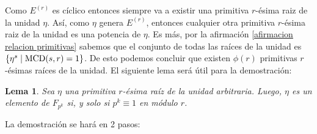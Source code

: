 \documentclass[10pt]{article}
\newcommand{\0}{\mathbf{0}}
\newcommand{\1}{\mathbf{1}}
\newcommand{\MCD}{{\rm MCD}}
\newcommand{\+}{\oplus}
\newcommand{\comentario}[1]{}
\newcommand{\comentarioin}[1]{}
\newtheorem{lemma}[theorem]{Lema}
\theoremstyle{remark}
\theoremstyle{remark}
\begin{document}
\comentarioin{Bernardo 8/11/20}
\comentarioin{Aca debo decir que $E^{(r)}$ es cíclico y por ende existe una primitiva} 
Como $E^{(r)}$ es cíclico entonces siempre va a existir una primitiva $r$-ésima raiz de la unidad $\eta$. 
Así, como $\eta$ genera $E^{(r)}$, entonces cualquier otra primitiva $r$-ésima raiz de la unidad es una potencia de $\eta$. Es más, por la afirmación \ref{afirmacion relacion primitivas} sabemos que el conjunto de todas las raíces de la unidad es $\{\eta^{s}\mid \MCD(s,r)=1\}$.
De esto podemos concluir que existen $\phi (r)$ primitivas $r$-ésimas raí­ces de la unidad.
	El siguiente lema será útil para la demostración:
	
	\begin{lemma} 
	  \comentarioin{Necesitamos la dirección $\Rightarrow$}
          
		Sea $\eta$ una primitiva $r$-ésima raí­z de la unidad arbitraria. Luego, $\eta$ es un elemento de $ F_{p^k} $ si, y solo si $ p^k\equiv 1$ en módulo $r$.
	\end{lemma}
	La demostración se hará en 2 pasos:\comentario{esto no se si se ve bien (enumerate)}
\end{document}

